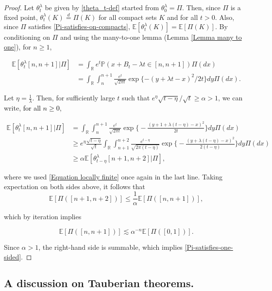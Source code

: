 \documentclass[a4paper,reqno]{amsart}%
\newcommand{\E}{\mathbb{E}}
\newcommand{\1}{\mathbf 1}
\theoremstyle{mine}
\numberwithin{theorem}{section}
\numberwithin{equation}{section}
\theoremstyle{remark}
\begin{document}
\begin{proof}

Let $\theta_t^\lambda$ be given by \eqref{theta_t-def} started from $\theta_0^\lambda= \Pi$. Then, since $\Pi$ is a fixed point,  $\theta_t^\lambda(K) \overset{d}{=} \Pi(K)$ for all compact sets $K$ and for all $t>0$. Also, since $\Pi$ satisfies \eqref{Pi-satisfies-on-compacts}, $\E[\theta_t^\lambda(K) ] = \E[\Pi(K)]$. 
By conditioning on $\Pi$ and using the many-to-one lemma (Lemma \ref{Lemma many to one}), for $n\geq 1$, 

\begin{align} \label{Equation locally finite}
\nonumber\mathbb E[\theta_t^\lambda[n,n+1]\bigl|\Pi] &=\int_{\mathbb R} e^{t} \mathbb P(x+B_t-\lambda t \in [n,n+1])\Pi(dx) \\
&= \int_{\mathbb R} \int_{n}^{n+1} \frac{e^t}{\sqrt{2 \pi t}} \exp\{-(y+\lambda t-x)^2/2t\} dy \Pi(dx).
\end{align}

Let $\eta=\frac{1}{\lambda}$. Then, for sufficiently large $t$ such that $e^{\eta}\sqrt{t-\eta}/\sqrt{t} \geq \alpha >1$, we can write, \textcolor{black}{for all $n \ge 0$},


\begin{align*}
\mathbb E[\theta_t^\lambda[n,n+1]\bigl|\Pi]&= \int_{\mathbb R} \int_{n}^{n+1} \frac{e^t}{\sqrt{2 \pi t}}  \exp\biggl\{-\frac{(y+1+\lambda (t-\eta)-x)^2}{2t}\biggr\} dy \Pi(dx)\\
& \ge e^{\eta}\frac{\sqrt{t-\eta}}{\sqrt{t}}\int_{\mathbb R} \int_{n+1}^{n+2} \frac{e^{t-\eta}}{\sqrt{2\pi (t-\eta)}}  \exp\biggl\{-\frac{(y+\lambda (t-\eta)-x)^2}{2(t-\eta)}\biggr\} dy \Pi(dx)\\
&\ge \alpha \mathbb E[\theta_{t-\eta}^\lambda[n+1,n+2]\bigl|\Pi],
\end{align*}

where we used \eqref{Equation locally finite} once again in the last line. Taking expectation on both sides above, it follows that 
\[ \mathbb{E}[\Pi([n+1, n+2])] \leq \frac{1}{\alpha}  \mathbb{E}[\Pi([n, n+1])],\]

which by iteration implies 

\[\mathbb{E}[\Pi([n, n+1])] \lesssim \alpha^{-n} \mathbb{E}[\Pi([0, 1])].\]

Since $\alpha >1$, the right-hand side is summable, which implies \eqref{Pi-satisfies-one-sided}.


\end{proof}
 
\subsection{A discussion on Tauberian theorems.}
\end{document}
